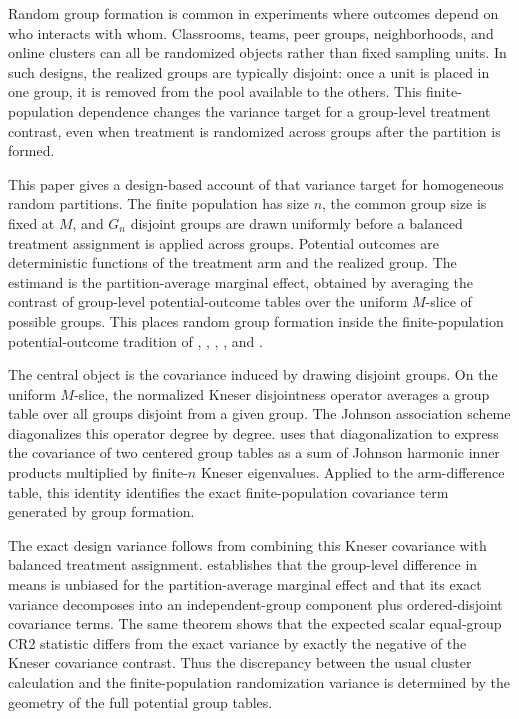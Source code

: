 Random group formation is common in experiments where outcomes depend on who interacts with whom. Classrooms, teams, peer groups, neighborhoods, and online clusters can all be randomized objects rather than fixed sampling units. In such designs, the realized groups are typically disjoint: once a unit is placed in one group, it is removed from the pool available to the others. This finite-population dependence changes the variance target for a group-level treatment contrast, even when treatment is randomized across groups after the partition is formed.

This paper gives a design-based account of that variance target for homogeneous random partitions. The finite population has size \(n\), the common group size is fixed at \(M\), and \(G_n\) disjoint groups are drawn uniformly before a balanced treatment assignment is applied across groups. Potential outcomes are deterministic functions of the treatment arm and the realized group. The estimand is the partition-average marginal effect, obtained by averaging the contrast of group-level potential-outcome tables over the uniform \(M\)-slice of possible groups. This places random group formation inside the finite-population potential-outcome tradition of \citet{Neyman1923}, \citet{Fisher1935}, \citet{Cox1958}, \citet{Rubin1974}, and \citet{Holland1986}.

The central object is the covariance induced by drawing disjoint groups. On the uniform \(M\)-slice, the normalized Kneser disjointness operator averages a group table over all groups disjoint from a given group. The Johnson association scheme diagonalizes this operator degree by degree.  uses that diagonalization to express the covariance of two centered group tables as a sum of Johnson harmonic inner products multiplied by finite-\(n\) Kneser eigenvalues. Applied to the arm-difference table, this identity identifies the exact finite-population covariance term generated by group formation.

The exact design variance follows from combining this Kneser covariance with balanced treatment assignment.  establishes that the group-level difference in means is unbiased for the partition-average marginal effect and that its exact variance decomposes into an independent-group component plus ordered-disjoint covariance terms. The same theorem shows that the expected scalar equal-group CR2 statistic differs from the exact variance by exactly the negative of the Kneser covariance contrast. Thus the discrepancy between the usual cluster calculation and the finite-population randomization variance is determined by the geometry of the full potential group tables.

